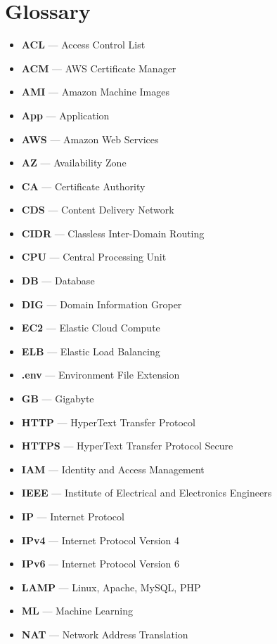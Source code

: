 \chapter{Glossary}\label{ch:glossary}

\begin{itemize}
    \item  \textbf{ACL} — Access Control List
    \item  \textbf{ACM} — AWS Certificate Manager
    \item  \textbf{AMI} — Amazon Machine Images
    \item  \textbf{App} — Application
    \item  \textbf{AWS} — Amazon Web Services
    \item  \textbf{AZ} — Availability Zone
    \item  \textbf{CA} — Certificate Authority
    \item  \textbf{CDS} — Content Delivery Network
    \item  \textbf{CIDR} — Classless Inter-Domain Routing
    \item  \textbf{CPU} — Central Processing Unit
    \item  \textbf{DB} — Database
    \item  \textbf{DIG} — Domain Information Groper
    \item  \textbf{EC2} — Elastic Cloud Compute
    \item  \textbf{ELB} — Elastic Load Balancing
    \item  \textbf{.env} — Environment File Extension
    \item  \textbf{GB} — Gigabyte
    \item  \textbf{HTTP} — HyperText Transfer Protocol
    \item  \textbf{HTTPS} — HyperText Transfer Protocol Secure
    \item  \textbf{IAM} — Identity and Access Management
    \item  \textbf{IEEE} — Institute of Electrical and Electronics Engineers
    \item  \textbf{IP} — Internet Protocol
    \item  \textbf{IPv4} — Internet Protocol Version 4
    \item  \textbf{IPv6} — Internet Protocol Version 6
    \item  \textbf{LAMP} — Linux, Apache, MySQL, PHP
    \item  \textbf{ML} — Machine Learning
    \item  \textbf{NAT} — Network Address Translation

\end{itemize}
